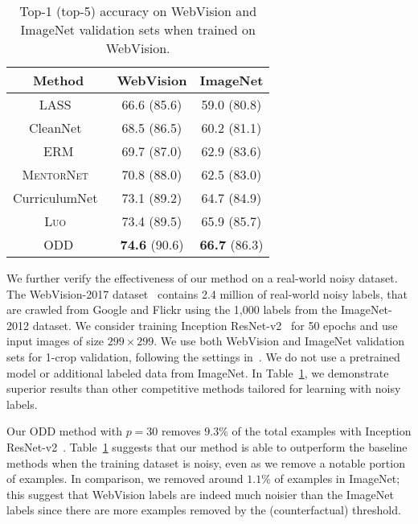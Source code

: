 \documentclass[a4paper,11pt]{article}
\begin{document}
\begin{table}
\centering
\caption{Top-1 (top-5) accuracy on WebVision and ImageNet validation sets when trained on WebVision. }
\label{tab:webvision}
    \begin{tabular}{c | c c}
    \toprule
     Method    & WebVision & ImageNet \\\midrule


        LASS~\cite{arpit2017a} & 66.6 (85.6) & 59.0 (80.8) \\
        CleanNet~\cite{lee2018cleannet}  & 68.5 (86.5) & 60.2 (81.1) \\
        \textsc{ERM} & 69.7 (87.0) & 62.9 (83.6) \\
        \textsc{MentorNet}~\cite{jiang2017mentornet} & 70.8 (88.0) & 62.5 (83.0) \\
CurriculumNet~\cite{guo2018curriculumnet} & 73.1 (89.2) & 64.7 (84.9) \\
        \textsc{Luo}~\cite{luo2019simple} & 73.4 (89.5) & 65.9 (85.7) \\
        \midrule
        \textsc{ODD} &  \textbf{74.6} (90.6) & \textbf{66.7} (86.3)  \\\bottomrule
    \end{tabular}
\end{table}

We further verify the effectiveness of our method on a real-world noisy dataset. The WebVision-2017 dataset~\cite{li2017webvision} contains 2.4 million of real-world noisy labels, that are crawled from Google and Flickr using the 1,000 labels from the ImageNet-2012 dataset. 
We consider training Inception ResNet-v2~\cite{szegedy2016inception} for 50 epochs and use input images of size $299 \times  299$. 
We use both WebVision and ImageNet validation sets for 1-crop validation, following the settings in~\cite{jiang2017mentornet}. We do not use a pretrained model or additional labeled data from ImageNet.
In Table~\ref{tab:webvision}, we demonstrate superior results than other competitive methods tailored for learning with noisy labels. 

Our \textsc{ODD} method with $p = 30$ removes $9.3\%$ of the total examples with Inception ResNet-v2~\cite{szegedy2016inception}. Table~\ref{tab:webvision} suggests that our method is able to outperform the baseline methods when the training dataset is noisy, even as we remove a notable portion of examples. In comparison, we removed around $1.1\%$ of examples in ImageNet;  this suggest that WebVision labels are indeed much noisier than the ImageNet labels since there are more examples removed by the (counterfactual) threshold. 
\end{document}
